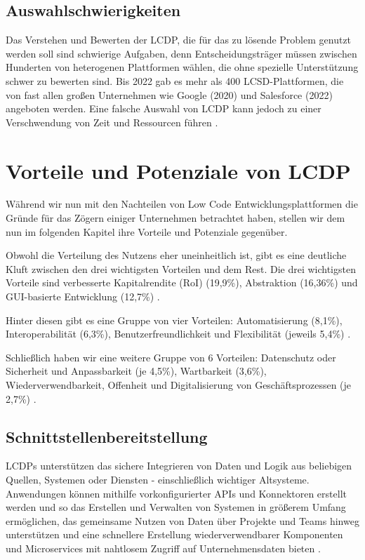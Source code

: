 \documentclass[12pt]{article} %
\begin{document}
	\subsection{Auswahlschwierigkeiten}	
	Das Verstehen und Bewerten der LCDP, die für das zu lösende Problem genutzt werden soll sind schwierige Aufgaben, denn  Entscheidungsträger müssen zwischen Hunderten von heterogenen Plattformen wählen, die ohne spezielle Unterstützung schwer zu bewerten sind. Bis 2022 gab es mehr als 400 LCSD-Plattformen, die von fast allen großen Unternehmen wie Google (2020) und Salesforce (2022) angeboten werden. Eine falsche Auswahl von LCDP kann jedoch zu einer Verschwendung von Zeit und Ressourcen führen \cite{Alamin.2023}. 
	
	\section{Vorteile  und Potenziale von LCDP}
	Während wir nun mit den Nachteilen von Low Code Entwicklungsplattformen die Gründe für das Zögern einiger Unternehmen betrachtet haben, stellen wir dem nun im folgenden Kapitel ihre Vorteile und Potenziale gegenüber.	
	
	Obwohl die Verteilung des Nutzens eher uneinheitlich ist, gibt es eine deutliche Kluft zwischen den drei wichtigsten Vorteilen und dem Rest. Die drei wichtigsten Vorteile sind verbesserte Kapitalrendite (RoI) (19,9\%), Abstraktion (16,36\%) und GUI-basierte Entwicklung (12,7\%) \cite{Bucaioni.2022}. 
	
	Hinter diesen gibt es eine Gruppe von vier Vorteilen: Automatisierung (8,1\%), Interoperabilität (6,3\%), Benutzerfreundlichkeit und Flexibilität (jeweils 5,4\%) \cite{Bucaioni.2022}.
	
	Schließlich haben wir eine weitere Gruppe von 6 Vorteilen: Datenschutz oder Sicherheit und Anpassbarkeit (je 4,5\%), Wartbarkeit (3,6\%), Wiederverwendbarkeit, Offenheit	und Digitalisierung von Geschäftsprozessen (je 2,7\%) \cite{Bucaioni.2022}.
	
	\subsection{Schnittstellenbereitstellung} 
	LCDPs unterstützen das sichere Integrieren von Daten und Logik aus beliebigen Quellen, Systemen oder Diensten - einschließlich wichtiger Altsysteme. Anwendungen können mithilfe vorkonfigurierter APIs und Konnektoren erstellt werden und so das Erstellen und Verwalten von Systemen in größerem Umfang ermöglichen, das gemeinsame Nutzen von Daten über Projekte und Teams hinweg unterstützen und eine schnellere Erstellung wiederverwendbarer Komponenten und Microservices mit nahtlosem Zugriff auf Unternehmensdaten bieten \cite{Mendix.2023}.
	
\end{document}

